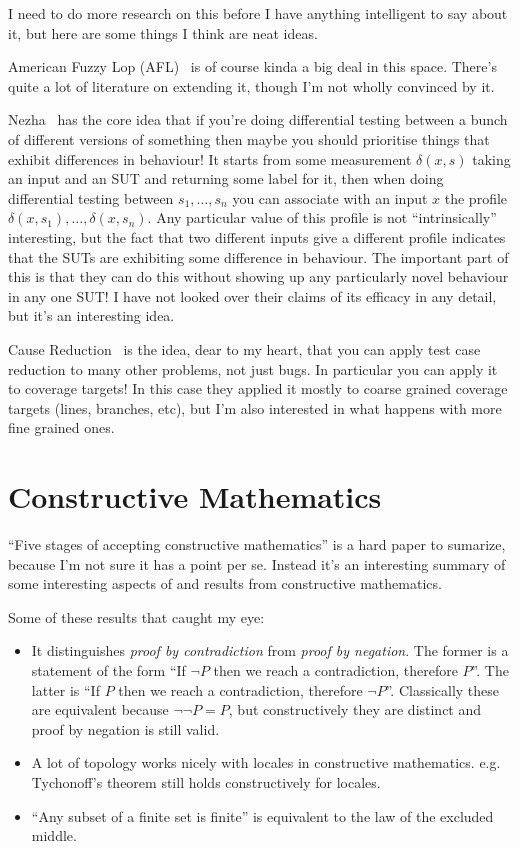 \documentclass[a4paper]{book}
\begin{document}
I need to do more research on this before I have anything intelligent to say about it,
but here are some things I think are neat ideas.

American Fuzzy Lop (AFL)~\cite{AFL} is of course kinda a big deal in this space.
There's quite a lot of literature on extending it,
though I'm not wholly convinced by it.

Nezha~\cite{DBLP:conf/sp/PetsiosTSKJ17} has the core idea that if you're doing differential testing between a bunch of different versions of something then maybe you should prioritise things that exhibit differences in behaviour!
It starts from some measurement \(\delta(x, s)\) taking an input and an SUT and returning some label for it,
then when doing differential testing between \(s_1, \ldots, s_n\) you can associate with an input \(x\) the profile \(\delta(x, s_1), \ldots, \delta(x, s_n)\).
Any particular value of this profile is not ``intrinsically'' interesting,
but the fact that two different inputs give a different profile indicates that the SUTs are exhibiting some difference in behaviour.
The important part of this is that they can do this without showing up any particularly novel behaviour in any one SUT!\@
I have not looked over their claims of its efficacy in any detail,
but it's an interesting idea.

Cause Reduction~\cite{DBLP:journals/stvr/GroceAZCR16} is the idea,
dear to my heart,
that you can apply test case reduction to many other problems,
not just bugs.
In particular you can apply it to coverage targets!
In this case they applied it mostly to coarse grained coverage targets (lines, branches, etc),
but I'm also interested in what happens with more fine grained ones.

\section{Constructive Mathematics}

``Five stages of accepting constructive mathematics''\cite{bauer2017five} is a hard paper to sumarize,
because I'm not sure it has a point per se.
Instead it's an interesting summary of some interesting aspects of and results from constructive mathematics.

Some of these results that caught my eye:

\begin{itemize}
\item It distinguishes \emph{proof by contradiction} from \emph{proof by negation}.
The former is a statement of the form ``If \(\lnot P\) then we reach a contradiction, therefore \(P\)''.
The latter is ``If \(P\) then we reach a contradiction, therefore \(\lnot P\)''.
Classically these are equivalent because \(\lnot \lnot P = P\),
but constructively they are distinct and proof by negation is still valid.
\item A lot of topology works nicely with locales in constructive mathematics.
e.g. Tychonoff's theorem still holds constructively for locales.
\item ``Any subset of a finite set is finite'' is equivalent to the law of the excluded middle.
\end{itemize}
\end{document}
